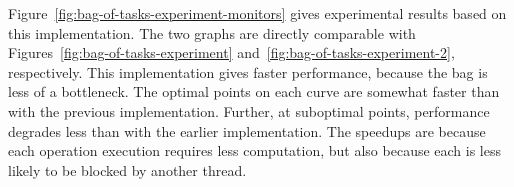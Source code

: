 
Figure~\ref{fig:bag-of-tasks-experiment-monitors}
gives experimental results based on this implementation.  The two graphs are
directly comparable with Figures~\ref{fig:bag-of-tasks-experiment}
and~\ref{fig:bag-of-tasks-experiment-2}, respectively.
%
This implementation gives faster performance, because the bag is less of a
bottleneck.  The optimal points on each curve are somewhat faster than with
the previous implementation.  Further, at suboptimal points, performance
degrades less than with the earlier implementation.  The speedups are 
because each operation execution requires less computation, but also because 
each is less likely to be blocked by another thread.  






